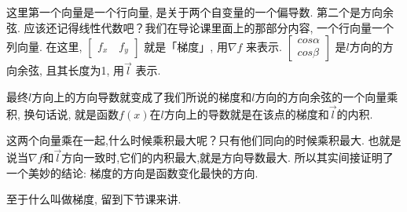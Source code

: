 这里第一个向量是一个行向量, 是关于两个自变量的一个偏导数. 第二个是方向余弦. 应该还记得线性代数吧？我们在导论课里面上的那部分内容, 一个行向量一个列向量. 在这里, $\begin{bmatrix} f_x \quad f_y \end{bmatrix}$ 就是「梯度」, 用$\nabla f$ 来表示. $\begin{bmatrix} cos \alpha \\ cos \beta \end{bmatrix}$ 是$l$方向的方向余弦, 且其长度为1, 用$\vec l$ 表示. 

最终$l$方向上的方向导数就变成了我们所说的梯度和$l$方向的方向余弦的一个向量乘积, 换句话说, 就是函数$f(x)$在$l$方向上的导数就是在该点的梯度和$\vec l$的内积. 

这两个向量乘在一起,什么时候乘积最大呢？只有他们同向的时候乘积最大. 也就是说当$\nabla f$和$\vec l$方向一致时,它们的内积最大,就是方向导数最大. 所以其实间接证明了一个美妙的结论: 梯度的方向是函数变化最快的方向. 

至于什么叫做梯度, 留到下节课来讲. 